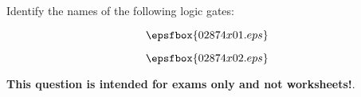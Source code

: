 

Identify the names of the following logic gates:

$$\epsfbox{02874x01.eps}$$







$$\epsfbox{02874x02.eps}$$







{\bf This question is intended for exams only and not worksheets!}.




